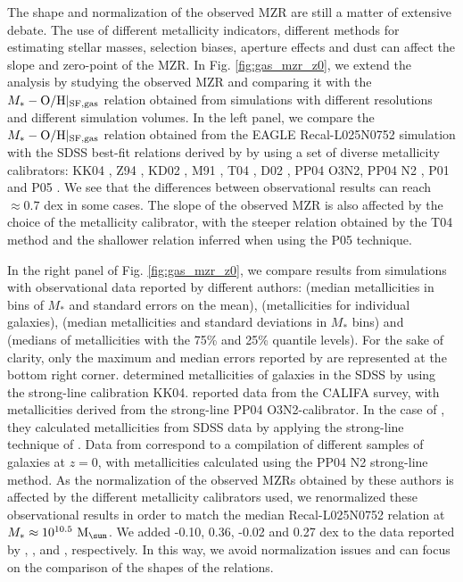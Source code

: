 \documentclass[useAMS,usenatbib]{mn2e}
\begin{document}
The shape and normalization of the observed MZR are still a matter of extensive
debate. 
The use of different metallicity indicators, different methods
for estimating stellar masses, selection biases, aperture effects and dust can affect the slope and
zero-point of the MZR.
In Fig. \ref{fig:gas_mzr_z0}, we extend the analysis by \citet{schaye2015}  
studying the observed MZR and comparing it with the
$M_* - {\rm O/H}|_{\rm SF,gas}$ relation obtained 
from simulations with different resolutions and different simulation volumes. 
In the left panel, we compare the 
$M_* - {\rm O/H}|_{\rm SF,gas}$ relation obtained from the EAGLE Recal-L025N0752 simulation with the SDSS best-fit 
relations derived by \citet{kewley2008} by using a set of diverse metallicity calibrators:
KK04 \citep{kobulnicky2004}, Z94 \citep{zaritsky1994}, KD02 \citep{kewley2002}, 
M91 \citep{mcgaugh1991}, T04 \citep{tremonti2004}, D02 \citep{denicolo2002}, 
PP04 O3N2, PP04 N2 \citep{pettini2004}, P01 \citep{pilyugin2001} and P05 \citep{pilyugin2005}.
We see that the differences between observational results can reach 
$\approx 0.7$ dex in some cases. The slope of the observed MZR is also affected by the choice of the metallicity
calibrator, with the steeper relation obtained by the T04 method and the shallower relation
inferred when using the P05 technique.

In the right panel of Fig. \ref{fig:gas_mzr_z0}, we compare results from simulations with observational data
reported by different authors: 
\citet{zahid2012} (median metallicities in bins of $M_*$ 
and standard errors on the mean), \citet{sanchez2013} (metallicities for individual galaxies), 
\citet{salim2014} (median metallicities and standard deviations
in $M_*$ bins) and \citet{hunt2016} (medians of metallicities with the 75\% and 25\% quantile levels).
For the sake of clarity, only the maximum and median errors reported by \citet{sanchez2013} are represented
at the bottom right corner.
\citet{zahid2012} determined metallicities of galaxies in the SDSS by using the strong-line 
calibration KK04.
\citet{sanchez2013} reported data from the CALIFA survey, 
with metallicities derived from the strong-line PP04 O3N2-calibrator.
In the case of \citet{salim2014}, they calculated metallicities from  SDSS data by applying the
strong-line technique of \citet{mannucci2010}. 
Data from \citet{hunt2016} correspond to a compilation of different samples of galaxies
at $z=0$, with metallicities calculated using the PP04 N2 strong-line method.
As the normalization of the observed MZRs obtained by these authors is affected by the different 
metallicity calibrators used, we renormalized these
observational results in order
to match the median Recal-L025N0752 relation at $M_* \approx 10^{10.5} \ {\rm M}_{\sun}$. 
We added -0.10, 0.36, -0.02 and 0.27 dex to the data reported by \citet{zahid2012},
\citet{sanchez2013}, \citet{salim2014} and \citet{hunt2016}, respectively.
In this way, we avoid normalization issues and can 
focus on the comparison of the shapes of the relations.
\end{document}
